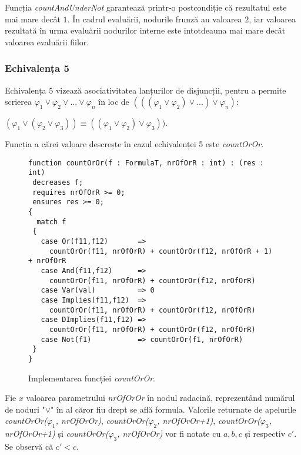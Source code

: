 Funcția \textit{countAndUnderNot} garantează printr-o postcondiție că rezultatul este mai mare decât $1$. În cadrul evaluării, nodurile frunză au valoarea $2$, iar valoarea rezultată în urma evaluării nodurilor interne este intotdeauna mai mare decât valoarea evaluării fiilor. 

\subsubsection{Echivalența 5}

Echivalența 5 vizează asociativitatea lanțurilor de disjuncții, pentru a permite scrierea $\varphi_1 \lor \varphi_2 \lor  . . . \lor \varphi_n$ în loc de
$(((\varphi_1 \lor \varphi_2) \lor  . . .) \lor \varphi_n)$:
\begin{center}
$(\varphi_1 \lor (\varphi_2 \lor \varphi_3)) \equiv ((\varphi_1 \lor \varphi_2) \lor \varphi_3))$.
\end{center} 

Funcția a cărei valoare descrește în cazul echivalenței 5 este \textit{countOrOr}.

\begin{figure}[H]
    \caption{Implementarea funcției \textit{countOrOr}.}
\begin{Verbatim}[fontsize=\small, frame=single,baselinestretch=0.1]
function countOrOr(f : FormulaT, nrOfOrR : int) : (res : int)
 decreases f;
 requires nrOfOrR >= 0;
 ensures res >= 0;
{
  match f
 {
   case Or(f11,f12)       => 
     countOrOr(f11, nrOfOrR) + countOrOr(f12, nrOfOrR + 1) + nrOfOrR
   case And(f11,f12)      => 
     countOrOr(f11, nrOfOrR) + countOrOr(f12, nrOfOrR)
   case Var(val)          => 0
   case Implies(f11,f12)  => 
     countOrOr(f11, nrOfOrR) + countOrOr(f12, nrOfOrR)
   case DImplies(f11,f12) => 
     countOrOr(f11, nrOfOrR) + countOrOr(f12, nrOfOrR)
   case Not(f1)           => countOrOr(f1, nrOfOrR)
 }
}
\end{Verbatim}
\end{figure}

Fie $x$ valoarea parametrului \textit{nrOfOrOr} în nodul radacină, reprezentând numărul de noduri "$\lor$" în al căror fiu drept se află formula. Valorile returnate de apelurile  \textit{countOrOr($\varphi_1$, nrOfOrOr)}, \textit{countOrOr($\varphi_2$, nrOfOrOr+1)}, \textit{countOrOr($\varphi_3$, nrOfOrOr+1)} și \textit{countOrOr($\varphi_3$, nrOfOrOr)} vor fi notate cu $a, b, c$ și respectiv $c'$. Se observă că $c' < c$.


